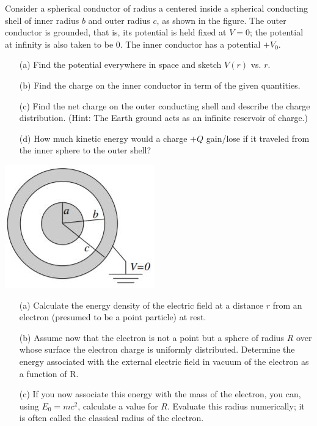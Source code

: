 \documentclass[11pt,letterpaper,boxed]{hmcpset}
\begin{document}
	\begin{problem} [Problem 4]
		Consider a spherical conductor of radius a centered inside a spherical conducting shell of inner radius $b$ and outer radius $c$, as shown in the figure. The outer conductor is grounded, that is, its potential is held fixed at $V = 0$; the potential at infinity is also taken to be 0. The inner conductor has a potential $+V_0$.
		\begin{enumerate}
			\item [(a)] Find the potential everywhere in space and sketch $V(r)$ vs. $r$.
			\item [(b)] Find the charge on the inner conductor in term of the given quantities.
			\item [(c)] Find the net charge on the outer conducting shell and describe the charge distribution. (Hint: The Earth ground acts as an infinite reservoir of charge.)
			\item [(d)] How much kinetic energy would a charge $+Q$ gain/lose if it traveled from the inner sphere to the outer shell?
		\end{enumerate}
	
		\begin{center}
		\includegraphics[scale=.7]{51m6pic2.jpg}
		\end{center}
	
	\end{problem}
	
	\begin{solution}
	\vfill
	\end{solution}
	\newpage

	\begin{problem} [Problem 5]
		\begin{enumerate}
			\item [(a)] Calculate the energy density of the electric field at a distance $r$ from an electron (presumed
			to be a point particle) at rest.
			\item [(b)] Assume now that the electron is not a point but a sphere of radius $R$ over whose surface the electron charge is uniformly distributed. Determine the energy associated with the external electric field in vacuum of the electron as a function of R.
			\item [(c)] If you now associate this energy with the mass of the electron, you can, using $E_0 = mc^2$, calculate a value for $R$. Evaluate this radius numerically; it is often called the classical radius of the electron.
		\end{enumerate}
	
	\end{problem}
	
\end{document}
